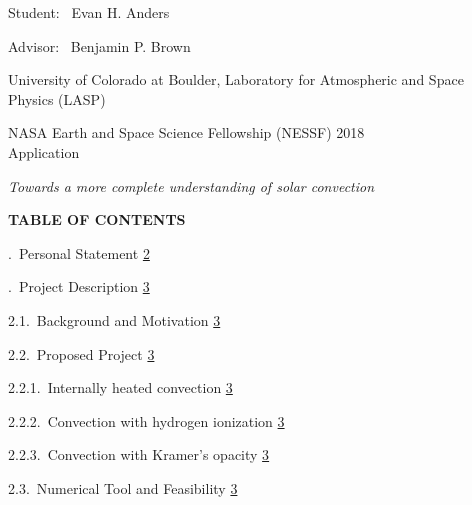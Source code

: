 \documentclass[12pt]{article}
\begin{document}
\begin{center}

\vspace*{0.07in}
Student: \, Evan H. Anders\hspace{0.6cm}

Advisor: \, Benjamin P. Brown

\vspace*{0.15in}
University of Colorado at Boulder, Laboratory for Atmospheric and Space Physics (LASP)

\vspace*{0.15in}
NASA Earth and Space Science Fellowship (NESSF) 2018 \\
Application

\vspace*{0.39in}
{\em Towards a more complete understanding of solar convection}

\vspace*{0.44in}
{\bf TABLE OF CONTENTS}
\end{center}

\vspace*{0.33in}
.$\,$ Personal Statement
\dotfill \hyperlink{page.2}{2}

\vspace*{0.06in}
.$\,$ Project Description
\dotfill \hyperlink{page.3}{3}

\vspace*{0.06in}
\noindent\hspace*{0.25in}
2.1.$\,$ Background and Motivation
\dotfill \hyperlink{page.3}{3}

\vspace*{0.06in}
\noindent\hspace*{0.25in}
2.2.$\,$ Proposed Project
\dotfill \hyperlink{page.3}{3}

\vspace*{0.06in}
\noindent\hspace*{0.50in}
2.2.1.$\,$ Internally heated convection
\dotfill \hyperlink{page.3}{3}

\vspace*{0.06in}
\noindent\hspace*{0.50in}
2.2.2.$\,$ Convection with hydrogen ionization
\dotfill \hyperlink{page.3}{3}

\vspace*{0.06in}
\noindent\hspace*{0.50in}
2.2.3.$\,$ Convection with Kramer's opacity
\dotfill \hyperlink{page.3}{3}

\vspace*{0.06in}
\noindent\hspace*{0.25in}
2.3.$\,$ Numerical Tool and Feasibility
\dotfill \hyperlink{page.3}{3}
\end{document}
